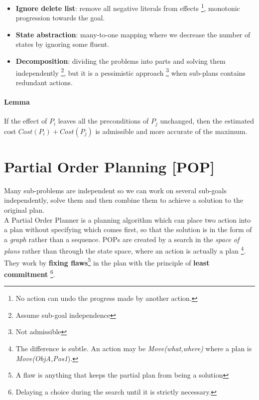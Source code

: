 \documentclass[5pt,a4paper]{article}
\begin{document}
\begin{itemize}
\begin{itemize}
\item \textbf{Ignore delete list}: remove all negative literals from effects \footnote{No action can undo the progress made by another action.}, monotonic progression towards the goal.

\item \textbf{State abstraction}: many-to-one mapping where we decrease the number of states by ignoring some fluent.

\item \textbf{Decomposition}: dividing the problems into parts and solving them independently \footnote{Assume sub-goal independence}, but it is a pessimistic approach \footnote{Not admissible} when sub-plans contains redundant actions.

\end{itemize}

\paragraph{Lemma}
If the effect of $P_i$ leaves all the preconditions of $P_j$ unchanged, then the estimated cost $Cost(P_i)+Cost(P_j)$ is admissible and more accurate of the maximum.





\newpage

\section{Partial Order Planning [POP]}

Many sub-problems are independent so we can work on several sub-goals independently, solve them and then combine them to achieve a solution to the original plan.\\
A Partial Order Planner is a planning algorithm which can place two action into a plan without specifying which comes first, so that the solution is in the form of a \textit{graph} rather than a sequence.
POPs are created by a search in the \textit{space of plans} rather than through the state space, where an action is actually a plan \footnote{The difference is subtle. An action may be \textit{Move(what,where)} where a plan is \textit{Move(ObjA,Pos1}).}. They work by  \textbf{fixing flaws}\footnote{A flaw is anything that keeps the partial plan from being a solution} in the plan with the principle of \textbf{least commitment} \footnote{Delaying a choice during the search until it is strictly necessary.}. \\


\end{itemize}
\end{document}

